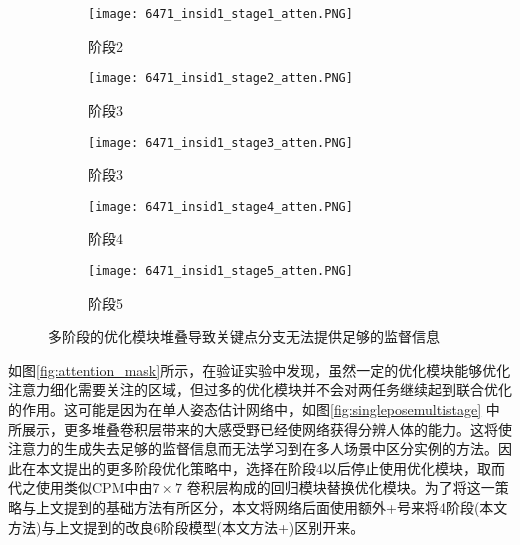 \begin{figure}[ht]
	\centering
	\begin{subfigure}[b]{0.18\linewidth}
		\texttt{[image: 6471\_insid1\_stage1\_atten.PNG]}
		\caption{阶段2}
	\end{subfigure}
	\begin{subfigure}[b]{0.18\linewidth}
		\texttt{[image: 6471\_insid1\_stage2\_atten.PNG]}
		\caption{阶段3}
	\end{subfigure}
	\begin{subfigure}[b]{0.18\linewidth}
		\texttt{[image: 6471\_insid1\_stage3\_atten.PNG]}
		\caption{阶段3}
	\end{subfigure}
	\begin{subfigure}[b]{0.18\linewidth}
		\texttt{[image: 6471\_insid1\_stage4\_atten.PNG]}
		\caption{阶段4}
	\end{subfigure}
	\begin{subfigure}[b]{0.18\linewidth}
		\texttt{[image: 6471\_insid1\_stage5\_atten.PNG]}
		\caption{阶段5}
	\end{subfigure}
	\caption{多阶段的优化模块堆叠导致关键点分支无法提供足够的监督信息}
	\label{fig:multistageattention}
\end{figure}

如图\ref{fig:attention_mask}所示，在验证实验中发现，虽然一定的优化模块能够优化注意力细化需要关注的区域，但过多的优化模块并不会对两任务继续起到联合优化的作用。这可能是因为在单人姿态估计网络中，如图\ref{fig:singleposemultistage} 中所展示，更多堆叠卷积层带来的大感受野已经使网络获得分辨人体的能力。这将使注意力的生成失去足够的监督信息而无法学习到在多人场景中区分实例的方法。因此在本文提出的更多阶段优化策略中，选择在阶段4以后停止使用优化模块，取而代之使用类似CPM\cite{wei2016convolutional}中由$7\times7$ 卷积层构成的回归模块替换优化模块。为了将这一策略与上文提到的基础方法有所区分，本文将网络后面使用额外+号来将4阶段(本文方法)与上文提到的改良6阶段模型(本文方法+)区别开来。

